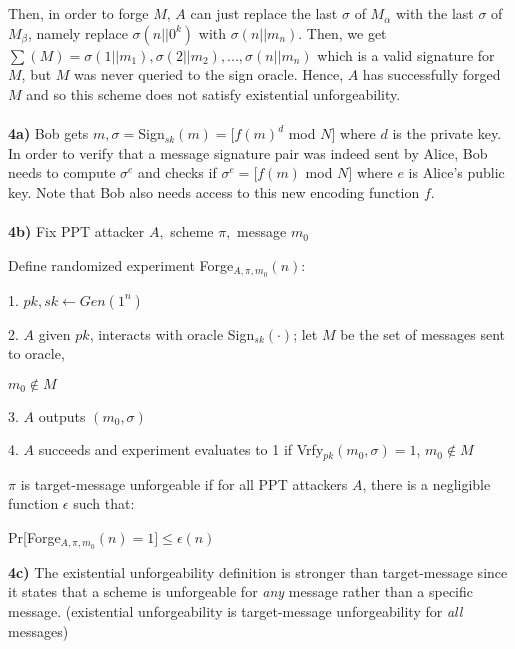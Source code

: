 \documentclass[12pt]{article}
\begin{document}
\\
\\
Then, in order to forge $M$, $A$ can just replace the last $\sigma$ of $M_\alpha$ with the last $\sigma$ of $M_\beta$, namely replace $\sigma(n||0^k)$ with $\sigma(n||m_n)$. Then, we get $\sum(M) = \sigma(1||m_1),\sigma(2||m_2),...,\sigma(n||m_n)$ which is a valid signature for $M$, but $M$ was never queried to the sign oracle. Hence, $A$ has successfully forged $M$ and so this scheme does not satisfy existential unforgeability.
\\
\\
\noindent \textbf{4a)} Bob gets $m,\sigma =$Sign$_{sk}(m)=[f(m)^d$ mod $N]$ where $d$ is the private key. In order to verify that a message signature pair was indeed sent by Alice, Bob needs to compute $\sigma^e$ and checks if $\sigma^e = [f(m)$ mod $N]$ where $e$ is Alice's public key. Note that Bob also needs access to this new encoding function $f$.
\\
\\
\noindent \textbf{4b)} Fix PPT attacker $A,$ scheme $ \pi,$ message $m_0$

Define randomized experiment Forge$_{A,\pi,m_0}(n)$:

1. $pk,sk \leftarrow Gen(1^n)$

2. $A$ given $pk$, interacts with oracle Sign$_{sk}(\cdot)$; let $M$ be the set of messages sent to oracle, 

$m_0 \notin M$

3. $A$ outputs $(m_0, \sigma)$

4. $A$ succeeds and experiment evaluates to 1 if Vrfy$_{pk}(m_0, \sigma)=1$, $m_0 \notin M$

\noindent $\pi$ is target-message unforgeable if for all PPT attackers $A$, there is a negligible function $\epsilon$ such that:
\begin{center}
Pr[Forge$_{A,\pi,m_0}(n)=1] \leq \epsilon(n)$
\end{center}

\noindent \textbf{4c)} The existential unforgeability definition is stronger than target-message since it states that a scheme is unforgeable for \emph{any} message rather than a specific message. (existential unforgeability is target-message unforgeability for \emph{all} messages) 
\end{document}
